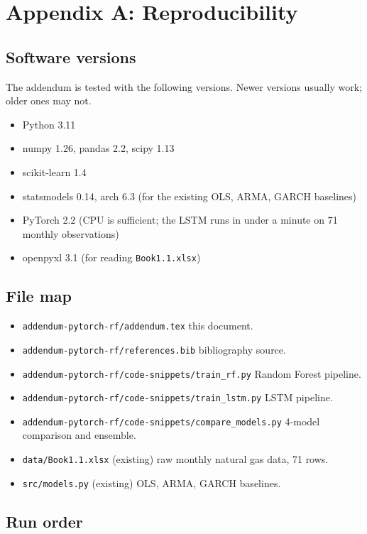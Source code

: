\documentclass[11pt,letterpaper]{article}
\begin{document}
\section{Appendix A: Reproducibility}

\subsection{Software versions}

The addendum is tested with the following versions. Newer versions usually work; older ones may not.

\begin{itemize}[leftmargin=*,nosep]
  \item Python 3.11
  \item numpy 1.26, pandas 2.2, scipy 1.13
  \item scikit-learn 1.4
  \item statsmodels 0.14, arch 6.3 (for the existing OLS, ARMA, GARCH baselines)
  \item PyTorch 2.2 (CPU is sufficient; the LSTM runs in under a minute on 71 monthly observations)
  \item openpyxl 3.1 (for reading \texttt{Book1.1.xlsx})
\end{itemize}

\subsection{File map}

\begin{itemize}[leftmargin=*,nosep]
  \item \texttt{addendum-pytorch-rf/addendum.tex} this document.
  \item \texttt{addendum-pytorch-rf/references.bib} bibliography source.
  \item \texttt{addendum-pytorch-rf/code-snippets/train\_rf.py} Random Forest pipeline.
  \item \texttt{addendum-pytorch-rf/code-snippets/train\_lstm.py} LSTM pipeline.
  \item \texttt{addendum-pytorch-rf/code-snippets/compare\_models.py} 4-model comparison and ensemble.
  \item \texttt{data/Book1.1.xlsx} (existing) raw monthly natural gas data, 71 rows.
  \item \texttt{src/models.py} (existing) OLS, ARMA, GARCH baselines.
\end{itemize}

\subsection{Run order}
\end{document}
